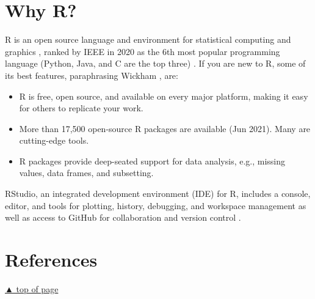 \documentclass[
]{book}
\providecommand{\tightlist}{%
  \setlength{\itemsep}{0pt}\setlength{\parskip}{0pt}}
\newlength{\cslhangindent}
\newlength{\cslentryspacingunit} %
\newenvironment{CSLReferences}[2] %
 {%
  \setlength{\parindent}{0pt}
  \ifodd #1
  \let\oldpar\par
  \def\par{\hangindent=\cslhangindent\oldpar}
  \fi
  \setlength{\parskip}{#2\cslentryspacingunit}
 }%
 {}
\begin{document}
\hypertarget{why-r}{%
\section*{Why R?}\label{why-r}}

R is an open source language and environment for statistical computing and graphics \citep{R-base}, ranked by IEEE in 2020 as the 6th most popular programming language (Python, Java, and C are the top three) \citep{Cass:2020}. If you are new to R, some of its best features, paraphrasing Wickham \citeyearpar{wickham2014advanced}, are:

\begin{itemize}
\tightlist
\item
  R is free, open source, and available on every major platform, making it easy for others to replicate your work.
\item
  More than 17,500 open-source R packages are available (Jun 2021). Many are cutting-edge tools.
\item
  R packages provide deep-seated support for data analysis, e.g., missing values, data frames, and subsetting.
\end{itemize}

RStudio, an integrated development environment (IDE) for R, includes a console, editor, and tools for plotting, history, debugging, and workspace management as well as access to GitHub for collaboration and version control \citep{2016rstudio}.

\hypertarget{references-1}{%
\section*{References}\label{references-1}}

\hypertarget{refs}{}
\begin{CSLReferences}{0}{0}
\end{CSLReferences}

\protect\hyperlink{get-start-r}{▲ top of page}

  
\end{document}
